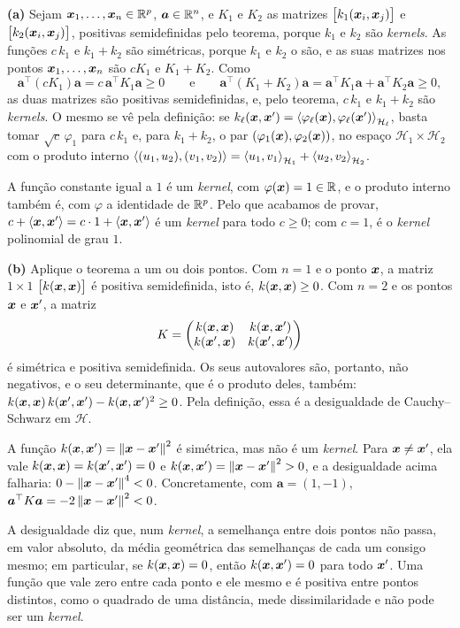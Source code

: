 \documentclass[11pt,a4paper]{article}
\begin{document}
\begin{solucao}
\textbf{(a)} Sejam $\bm{x}_1,\dots,\bm{x}_n\in\mathbb{R}^p$, $\bm a\in\mathbb{R}^n$, e $K_1$ e $K_2$ as
matrizes $\big[k_1(\bm{x}_i,\bm{x}_j)\big]$ e $\big[k_2(\bm{x}_i,\bm{x}_j)\big]$, positivas
semidefinidas pelo teorema, porque $k_1$ e $k_2$ são \emph{kernels}. As funções
$c\,k_1$ e $k_1+k_2$ são simétricas, porque $k_1$ e $k_2$ o são, e as suas matrizes
nos pontos $\bm{x}_1,\dots,\bm{x}_n$ são $cK_1$ e $K_1+K_2$. Como
\[
  \bm a^\top(cK_1)\bm a=c\,\bm a^\top K_1\bm a\ge0
  \qquad\text{e}\qquad
  \bm a^\top(K_1+K_2)\bm a=\bm a^\top K_1\bm a+\bm a^\top K_2\bm a\ge0,
\]
as duas matrizes são positivas semidefinidas, e, pelo teorema, $c\,k_1$ e $k_1+k_2$
são \emph{kernels}. O mesmo se vê pela definição: se
$k_\ell(\bm{x},\bm{x}')=\left\langle \varphi_\ell(\bm{x}), \varphi_\ell(\bm{x}') \right\rangle_{\mathcal H_\ell}$, basta
tomar $\sqrt c\,\varphi_1$ para $c\,k_1$ e, para $k_1+k_2$, o par
$(\varphi_1(\bm{x}),\varphi_2(\bm{x}))$, no espaço $\mathcal H_1\times\mathcal H_2$ com o
produto interno
$\left\langle (u_1,u_2), (v_1,v_2) \right\rangle=\left\langle u_1, v_1 \right\rangle_{\mathcal H_1}+\left\langle u_2, v_2 \right\rangle_{\mathcal H_2}$.

A função constante igual a $1$ é um \emph{kernel}, com $\varphi(\bm{x})=1\in\mathbb{R}$, e o
produto interno também é, com $\varphi$ a identidade de $\mathbb{R}^p$. Pelo que acabamos de
provar, $c+\left\langle \bm{x}, \bm{x}' \right\rangle=c\cdot1+\left\langle \bm{x}, \bm{x}' \right\rangle$ é um \emph{kernel} para todo
$c\ge0$; com $c=1$, é o \emph{kernel} polinomial de grau $1$.

\smallskip
\textbf{(b)} Aplique o teorema a um ou dois pontos. Com $n=1$ e o ponto $\bm{x}$, a matriz
$1\times1$ $\big[k(\bm{x},\bm{x})\big]$ é positiva semidefinida, isto é, $k(\bm{x},\bm{x})\ge0$. Com
$n=2$ e os pontos $\bm{x}$ e $\bm{x}'$, a matriz
\[
  K=\begin{pmatrix} k(\bm{x},\bm{x}) & k(\bm{x},\bm{x}')\\ k(\bm{x}',\bm{x}) & k(\bm{x}',\bm{x}')\end{pmatrix}
\]
é simétrica e positiva semidefinida. Os seus autovalores são, portanto, não negativos,
e o seu determinante, que é o produto deles, também:
$k(\bm{x},\bm{x})\,k(\bm{x}',\bm{x}')-k(\bm{x},\bm{x}')^2\ge0$. Pela definição, essa é a desigualdade de
Cauchy--Schwarz em $\mathcal H$.

A função $k(\bm{x},\bm{x}')=\left\lVert \bm{x}-\bm{x}' \right\rVert^2$ é simétrica, mas não é um \emph{kernel}. Para
$\bm{x}\ne\bm{x}'$, ela vale $k(\bm{x},\bm{x})=k(\bm{x}',\bm{x}')=0$ e $k(\bm{x},\bm{x}')=\left\lVert \bm{x}-\bm{x}' \right\rVert^2>0$, e a
desigualdade acima falharia: $0-\left\lVert \bm{x}-\bm{x}' \right\rVert^4<0$. Concretamente, com
$\bm a=(1,-1)$, $\bm a^\top K\bm a=-2\left\lVert \bm{x}-\bm{x}' \right\rVert^2<0$.

A desigualdade diz que, num \emph{kernel}, a semelhança entre dois pontos não passa,
em valor absoluto, da média geométrica das semelhanças de cada um consigo mesmo; em
particular, se $k(\bm{x},\bm{x})=0$, então $k(\bm{x},\bm{x}')=0$ para todo $\bm{x}'$. Uma função que vale
zero entre cada ponto e ele mesmo e é positiva entre pontos distintos, como o quadrado
de uma distância, mede dissimilaridade e não pode ser um \emph{kernel}.


\end{solucao}
\end{document}
